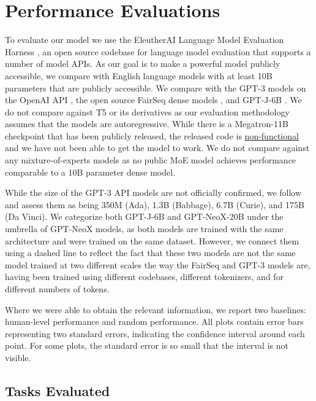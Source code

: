 \documentclass[11pt]{article}
\newcommand{\model}{GPT-NeoX-20B}
\begin{document}
\section{Performance Evaluations}
\label{sec:evals}

To evaluate our model we use the EleutherAI Language Model Evaluation Harness \citep{eval-harness}, an open source codebase for language model evaluation that supports a number of model APIs. As our goal is to make a powerful model publicly accessible, we compare with English language models with at least 10B parameters that are publicly accessible. We compare with the GPT-3 models on the OpenAI API \citep{brown2020language}, the open source FairSeq dense models \citep{fairseq-13B}, and GPT-J-6B \citep{gpt-j}. We do not compare against T5 \citep{raffel2020exploring} or its derivatives as our evaluation methodology assumes that the models are autoregressive. While there is a Megatron-11B checkpoint that has been publicly released, the released code is \href{https://github.com/pytorch/fairseq/issues/2358}{non-functional} and we have not been able to get the model to work. We do not compare against any mixture-of-experts models as no public MoE model achieves performance comparable to a 10B parameter dense model.

While the size of the GPT-3 API models are not officially confirmed, we follow \citet{gao2021sizes} and assess them as being 350M (Ada), 1.3B (Babbage), 6.7B (Curie), and 175B (Da Vinci). We categorize both GPT-J-6B and \model{} under the umbrella of GPT-NeoX models, as both models are trained with the same architecture and were trained on the same dataset. 
However, we connect them using a dashed line to reflect the fact that these two models are not the same model trained at two different scales the way the FairSeq and GPT-3 models are, having been trained using different codebases, different tokenizers, and for different numbers of tokens.

Where we were able to obtain the relevant information, we report two baselines: human-level performance and random performance. All plots contain error bars representing two standard errors, indicating the  confidence interval around each point. For some plots, the standard error is so small that the interval is not visible.

\subsection{Tasks Evaluated}
\label{subsec:lm}
\end{document}
